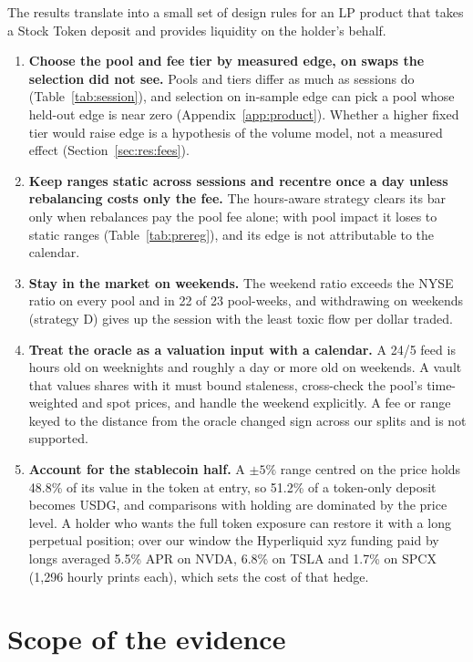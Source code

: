\documentclass[11pt]{article}
\begin{document}
The results translate into a small set of design rules for an LP product that takes a Stock Token deposit and provides liquidity on the holder's behalf.

\begin{enumerate}[leftmargin=*,itemsep=3pt]
\item \textbf{Choose the pool and fee tier by measured edge, on swaps the selection did not see.} Pools and tiers differ as much as sessions do (Table~\ref{tab:session}), and selection on in-sample edge can pick a pool whose held-out edge is near zero (Appendix~\ref{app:product}). Whether a higher fixed tier would raise edge is a hypothesis of the volume model, not a measured effect (Section~\ref{sec:res:fees}).
\item \textbf{Keep ranges static across sessions and recentre once a day unless rebalancing costs only the fee.} The hours-aware strategy clears its bar only when rebalances pay the pool fee alone; with pool impact it loses to static ranges (Table~\ref{tab:prereg}), and its edge is not attributable to the calendar.
\item \textbf{Stay in the market on weekends.} The weekend ratio exceeds the NYSE ratio on every pool and in 22 of 23 pool-weeks, and withdrawing on weekends (strategy D) gives up the session with the least toxic flow per dollar traded.
\item \textbf{Treat the oracle as a valuation input with a calendar.} A 24/5 feed is hours old on weeknights and roughly a day or more old on weekends. A vault that values shares with it must bound staleness, cross-check the pool's time-weighted and spot prices, and handle the weekend explicitly. A fee or range keyed to the distance from the oracle changed sign across our splits and is not supported.
\item \textbf{Account for the stablecoin half.} A $\pm5\%$ range centred on the price holds 48.8\% of its value in the token at entry, so 51.2\% of a token-only deposit becomes USDG, and comparisons with holding are dominated by the price level. A holder who wants the full token exposure can restore it with a long perpetual position; over our window the Hyperliquid xyz funding paid by longs averaged 5.5\% APR on NVDA, 6.8\% on TSLA and 1.7\% on SPCX (1,296 hourly prints each), which sets the cost of that hedge.
\end{enumerate}

\section{Scope of the evidence}\label{sec:scope}
\end{document}
